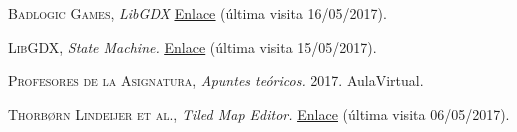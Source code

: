 \begin{thebibliography}{aaaa}
 \textsc{Badlogic Games}, \textit{LibGDX} \href{https://libgdx.badlogicgames.com/}{\color{blue}\underline{Enlace}} (última visita 16/05/2017).

 \textsc{LibGDX}, \textit{State Machine.} \href{https://github.com/libgdx/gdx-ai/wiki/State-Machine}{\color{blue}\underline{Enlace}} (última visita 15/05/2017).

 \textsc{Profesores de la Asignatura}, \textit{Apuntes teóricos.} 2017. AulaVirtual. 

 \textsc{Thorbørn Lindeijer et al.}, \textit{Tiled Map Editor.} \href{http://www.mapeditor.org/}{\color{blue}\underline{Enlace}} (última visita 06/05/2017).
\end{thebibliography}